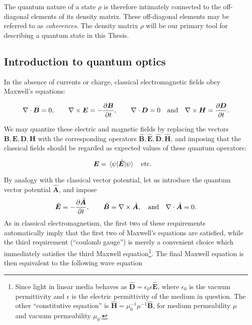 \noindent The quantum nature of a state $\rho$ is therefore intimately connected to the off-diagonal elements of its density matrix. These off-diagonal elements may be referred to as \emph{coherences}. The density matrix $\rho$ will be our primary tool for describing a quantum state in this Thesis.



\FloatBarrier
\subsection{Introduction to quantum optics}

In the absence of currents or charge, classical electromagnetic fields obey Maxwell's equations:

\begin{equation}
\nabla \cdot \bm{B} =0,\qq{} \nabla \times \bm{E} = - \frac{\partial \bm{B}}{\partial t},\qq{} \nabla \cdot \bm{D} = 0 \qq{and} \nabla \times \bm{H} = \frac{\partial \bm{D}}{\partial t}.
\end{equation}

\noindent We may quantize these electric and magnetic fields by replacing the vectors $\bm{B}, \bm{E}, \bm{D}, \bm{H}$ with the corresponding operators $\hat{\bm{B}}, \hat{\bm{E}}, \hat{\bm{D}}, \hat{\bm{H}}$, and imposing that the classical fields should be regarded as expected values of these quantum operators:

\begin{equation}
\bm{E} = \ev{\hat{\bm{E}}}{\psi} \qq{etc.}
\end{equation}

\noindent By analogy with the classical vector potential, let us introduce the quantum vector potential $\hat{\bm{A}}$, and impose
\begin{equation}
\hat{\bm{E}} = - \frac{\partial \hat{\bm{A}}}{\partial t}, \qq{}  \hat{\bm{B}} = \nabla \times \hat{\bm{A}}, \qq{and} \nabla \cdot \hat{\bm{A}} = 0.
\end{equation}
As in classical electromagnetism, the first two of these requirements automatically imply that the first two of Maxwell's equations are satisfied, while the third requirement (``coulomb gauge'') is merely a convenient choice which immediately satisfies the third Maxwell equation\footnote{Since light in linear media behaves as $\hat{\bm{D}} = \epsilon_0 \epsilon \hat{\bm{E}}$, where $\epsilon_0$ is the vacuum permittivity and $\epsilon$ is the electric permittivity of the medium in question. The other ``constitutive equation'' is $\hat{\bm{H}} = \mu_0^{-1} \mu^{-1} \hat{\bm{B}}$, for medium permeability $\mu$ and vacuum permeability $\mu_0$.}. The final Maxwell equation is then equivalent to the following wave equation

